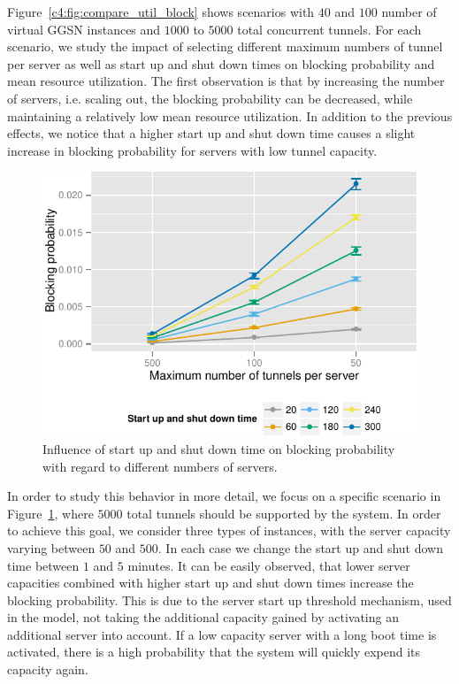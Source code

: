 Figure~\ref{c4:fig:compare_util_block} shows scenarios with $40$ and $100$ number of virtual \gls{GGSN} instances and  $1000$ to $5000$ total concurrent tunnels. For each scenario, we study the impact of selecting different maximum numbers of tunnel per server as well as start up and shut down times on blocking probability and mean resource utilization. The first observation is that by increasing the number of servers, i.e. scaling out, the blocking probability can be decreased, while maintaining a relatively low mean resource utilization. In addition to the previous effects, we notice that a higher start up and shut down time causes a slight increase in blocking probability for servers with low tunnel capacity.

\begin{figure}[htb]
  \centering
  \includegraphics{images/compare-maxinstances-block.pdf}
  \caption{Influence of start up and shut down time on blocking probability with regard to different numbers of servers.}
 \label{c4:fig:compare_maxinstances_block}
\end{figure}

In order to study this behavior in more detail, we focus on a specific scenario in Figure~\ref{c4:fig:compare_maxinstances_block}, where $5000$ total tunnels should be supported by the system. In order to achieve this goal, we consider three types of instances, with the server capacity varying between $50$ and $500$.  In each case we change the start up and shut down time between $1$ and $5$ minutes. It can be easily observed, that lower server capacities combined with higher start up and shut down times increase the blocking probability. This is due to the server start up threshold mechanism, used in the model, not taking the additional capacity gained by activating an additional server into account. If a low capacity server with a long boot time is activated, there is a high probability that the system will quickly expend its capacity again.

